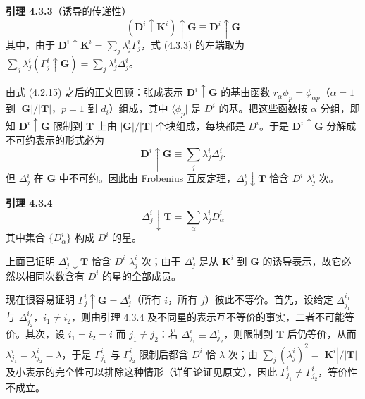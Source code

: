 \noindent\textbf{引理 4.3.3}\quad （诱导的传递性）
\begin{equation*}
(\mathbf{D}^{i} \uparrow \mathbf{K}^{i}) \uparrow \mathbf{G} \equiv \mathbf{D}^{i} \uparrow \mathbf{G}
\tag{4.3.3}
\end{equation*}
其中，由于 $\mathbf{D}^{i} \uparrow \mathbf{K}^{i} = \sum_{j}\lambda^{i}_{j}\Gamma^{i}_{j}$，式 (4.3.3) 的左端取为 $\sum_{j}\lambda^{i}_{j}(\Gamma^{i}_{j} \uparrow \mathbf{G}) = \sum_{j}\lambda^{i}_{j}\Delta^{i}_{j}$。

由式 (4.2.15) 之后的正文回顾：张成表示 $\mathbf{D}^{i} \uparrow \mathbf{G}$ 的基由函数 $r_{\alpha}\phi_{p} = \phi_{\alpha p}$（$\alpha = 1$ 到 $|\mathbf{G}|/|\mathbf{T}|$，$p = 1$ 到 $d_{i}$）组成，其中 $\langle \phi_{p} |$ 是 $D^{i}$ 的基。把这些函数按 $\alpha$ 分组，即知 $\mathbf{D}^{i} \uparrow \mathbf{G}$ 限制到 $\mathbf{T}$ 上由 $|\mathbf{G}|/|\mathbf{T}|$ 个块组成，每块都是 $D^{i}$。于是 $\mathbf{D}^{i} \uparrow \mathbf{G}$ 分解成不可约表示的形式必为
\begin{equation*}
\mathbf{D}^{i} \uparrow \mathbf{G} \equiv \sum_{j}\lambda^{i}_{j}\Delta^{i}_{j}.
\tag{4.3.4}
\end{equation*}
但 $\Delta^{i}_{j}$ 在 $\mathbf{G}$ 中不可约。因此由 Frobenius 互反定理，$\Delta^{i}_{j} \downarrow \mathbf{T}$ 恰含 $D^{i}$ $\lambda^{i}_{j}$ 次。

\noindent\textbf{引理 4.3.4}
\begin{equation*}
\Delta^{i}_{j} \downarrow \mathbf{T} = \sum_{\alpha}\lambda^{i}_{j}D^{i}_{\alpha}
\tag{4.3.5}
\end{equation*}
其中集合 $\{D^{i}_{\alpha}\}$ 构成 $D^{i}$ 的星。

上面已证明 $\Delta^{i}_{j} \downarrow \mathbf{T}$ 恰含 $D^{i}$ $\lambda^{i}_{j}$ 次；由于 $\Delta^{i}_{j}$ 是从 $\mathbf{K}^{i}$ 到 $\mathbf{G}$ 的诱导表示，故它必然以相同次数含有 $D^{i}$ 的星的全部成员。

现在很容易证明 $\Gamma^{i}_{j} \uparrow \mathbf{G} = \Delta^{i}_{j}$（所有 $i$，所有 $j$）彼此不等价。首先，设给定 $\Delta^{i_{1}}_{j_{1}}$ 与 $\Delta^{i_{2}}_{j_{2}}$，$i_{1} \neq i_{2}$，则由引理 4.3.4 及不同星的表示互不等价的事实，二者不可能等价。其次，设 $i_{1} = i_{2} = i$ 而 $j_{1} \neq j_{2}$：若 $\Delta^{i}_{j_{1}} \equiv \Delta^{i}_{j_{2}}$，则限制到 $\mathbf{T}$ 后仍等价，从而 $\lambda^{i}_{j_{1}} = \lambda^{i}_{j_{2}} = \lambda$，于是 $\Gamma^{i}_{j_{1}}$ 与 $\Gamma^{i}_{j_{2}}$ 限制后都含 $D^{i}$ 恰 $\lambda$ 次；由 $\sum_{j}(\lambda^{i}_{j})^{2} = |\mathbf{K}^{i}|/|\mathbf{T}|$ 及小表示的完全性可以排除这种情形（详细论证见原文），因此 $\Gamma^{i}_{j_{1}} \neq \Gamma^{i}_{j_{2}}$，等价性不成立。

